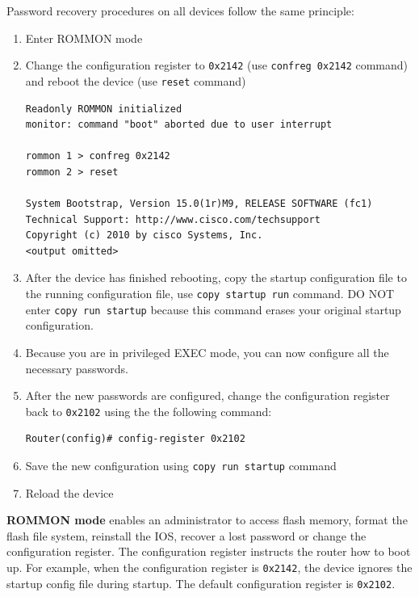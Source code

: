 Password recovery procedures on all devices follow the same principle:

\begin{enumerate}
\item Enter ROMMON mode

\item Change the configuration register to \verb|0x2142| (use \verb|confreg 0x2142| command) and reboot the device (use \verb|reset| command)

\begin{verbatim}
Readonly ROMMON initialized
monitor: command "boot" aborted due to user interrupt

rommon 1 > confreg 0x2142
rommon 2 > reset

System Bootstrap, Version 15.0(1r)M9, RELEASE SOFTWARE (fc1)
Technical Support: http://www.cisco.com/techsupport
Copyright (c) 2010 by cisco Systems, Inc.
<output omitted>
\end{verbatim}

\item After the device has finished rebooting, copy the startup configuration file to the running configuration file, use \verb|copy startup run| command. DO NOT enter \verb|copy run startup| because this command erases your original startup configuration.

\item Because you are in privileged EXEC mode, you can now configure all the necessary passwords.

\item After the new passwords are configured, change the configuration register back to \verb|0x2102| using the the following command:

\begin{verbatim}
Router(config)# config-register 0x2102
\end{verbatim}

\item Save the new configuration using \verb|copy run startup| command

\item Reload the device
\end{enumerate}

\textbf{ROMMON mode} enables an administrator to access flash memory, format the flash file system, reinstall the IOS, recover a lost password or change the configuration register. The configuration register instructs the router how to boot up. For example, when the configuration register is \verb|0x2142|, the device ignores the startup config file during startup. The default configuration register is \verb|0x2102|.

